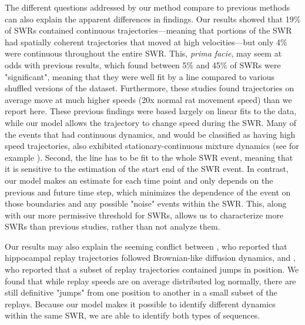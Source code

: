 \documentclass[9pt,lineno]{elife}
\begin{document}
The different questions addressed by our method compare to previous methods can also explain the apparent differences in findings. Our results showed that 19\% of SWRs contained continuous trajectories---meaning that portions of the SWR had spatially coherent trajectories that moved at high velocities---but only 4\% were continuous throughout the entire SWR. This, \textit{prima facie}, may seem at odds with previous results, which found between 5\% and 45\% of SWRs were "significant", meaning that they were well fit by a line compared to various shuffled versions of the dataset. Furthermore, these studies found trajectories on average move at much higher speeds (20x normal rat movement speed) than we report here. These previous findings were based largely on linear fits to the data, while our model allows the trajectory to change speed during the SWR. Many of the events that had continuous dynamics, and would be classified as having high speed trajectories, also exhibited stationary-continuous mixture dynamics (see for example ). Second, the line has to be fit to the whole SWR event, meaning that it is sensitive to the estimation of the start end of the SWR event. In contrast, our model makes an estimate for each time point and only depends on the previous and future time step, which minimizes the dependence of the event on those boundaries and any possible "noise" events within the SWR. This, along with our more permissive threshold for SWRs, allows us to characterize more SWRs than previous studies, rather than not analyze them.

Our results may also explain the seeming conflict between \cite{StellaHippocampalReactivationRandom2019}, who reported that hippocampal replay trajectories followed Brownian-like diffusion dynamics, and \cite{PfeifferAutoassociativedynamicsgeneration2015}, who reported that a subset of replay trajectories contained jumps in position. We found that while replay speeds are on average distributed log normally, there are still definitive "jumps" from one position to another in a small subset of the replays. Because our model makes it possible to identify different dynamics within the same SWR, we are able to identify both types of sequences.
\end{document}

